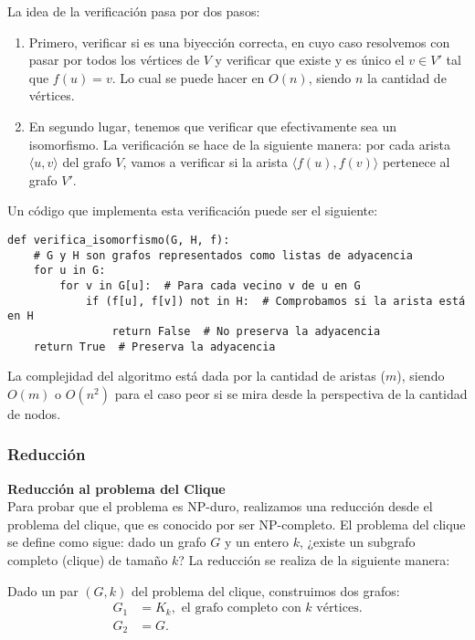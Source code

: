 \documentclass[12pt,a4paper]{article}
\begin{document}
La idea de la verificación pasa por dos pasos:

\begin{enumerate}
    \item Primero, verificar si es una biyección correcta, en cuyo caso resolvemos con pasar por todos los vértices de $V$ y verificar que existe y es único el $v \in V'$ tal que $f(u) = v$. Lo cual se puede hacer en $O(n)$, siendo $n$ la cantidad de vértices.
    
    \item En segundo lugar, tenemos que verificar que efectivamente sea un isomorfismo. La verificación se hace de la siguiente manera: por cada arista $\langle u,v \rangle$ del grafo $V$, vamos a verificar si la arista $\langle f(u),f(v) \rangle$ pertenece al grafo $V'$.
\end{enumerate}

Un código que implementa esta verificación puede ser el siguiente:
\begin{verbatim}
def verifica_isomorfismo(G, H, f):
    # G y H son grafos representados como listas de adyacencia
    for u in G:
        for v in G[u]:  # Para cada vecino v de u en G
            if (f[u], f[v]) not in H:  # Comprobamos si la arista está en H
                return False  # No preserva la adyacencia
    return True  # Preserva la adyacencia
\end{verbatim}

La complejidad del algoritmo está dada por la cantidad de aristas ($m$), siendo $O(m)$ o $O(n^2)$ para el caso peor si se mira desde la perspectiva de la cantidad de nodos.

\subsubsection{Reducción}
\textbf{Reducción al problema del Clique}\\
Para probar que el problema es NP-duro, realizamos una reducción desde el problema del clique, que es conocido por ser NP-completo. El problema del clique se define como sigue: dado un grafo $G$ y un entero $k$, ¿existe un subgrafo completo (clique) de tamaño $k$? La reducción se realiza de la siguiente manera:

Dado un par $(G,k)$ del problema del clique, construimos dos grafos:
\begin{align*}
    G_1 &= K_k, \text{ el grafo completo con } k \text{ vértices.}\\
    G_2 &= G.
\end{align*}
\end{document}
